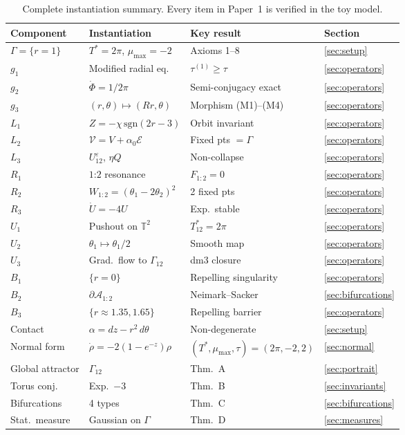 \documentclass[reqno]{amsart}
\numberwithin{equation}{section}
\theoremstyle{plain}
\theoremstyle{definition}
\theoremstyle{remark}
\newcommand{\T}{\mathbb{T}}
\newcommand{\Orb}{\Gamma}
\newcommand{\eps}{\varepsilon}
\begin{document}
\begin{table}[ht]
\centering
\begin{tabular}{@{}llll@{}}
\toprule
Component & Instantiation & Key result & Section\\
\midrule
$\Orb=\{r=1\}$ & $T^*=2\pi$, $\mu_{\max}=-2$ & Axioms 1--8 & \ref{sec:setup}\\
$g_1$ & Modified radial eq. & $\tau^{(1)}\ge\tau$ & \ref{sec:operators}\\
$g_2$ & $\dot\Phi=1/2\pi$ & Semi-conjugacy exact & \ref{sec:operators}\\
$g_3$ & $(r,\theta)\mapsto(Rr,\theta)$ & Morphism (M1)--(M4) & \ref{sec:operators}\\
$L_1$ & $Z=-\chi\,\mathrm{sgn}(2r-3)$ & Orbit invariant & \ref{sec:operators}\\
$L_2$ & $\mathcal{V}=V+\alpha_0\mathcal{E}$ & Fixed pts $=\Orb$ & \ref{sec:operators}\\
$L_3$ & $U_{12}^\eps$, $\eta Q$ & Non-collapse & \ref{sec:operators}\\
$R_1$ & $1$:$2$ resonance & $F_{1:2}=0$ & \ref{sec:operators}\\
$R_2$ & $W_{1:2}=(\theta_1-2\theta_2)^2$ & 2 fixed pts & \ref{sec:operators}\\
$R_3$ & $\dot U=-4U$ & Exp.\ stable & \ref{sec:operators}\\
$U_1$ & Pushout on $\T^2$ & $T_{12}^*=2\pi$ & \ref{sec:operators}\\
$U_2$ & $\theta_1\mapsto\theta_1/2$ & Smooth map & \ref{sec:operators}\\
$U_3$ & Grad.\ flow to $\Orb_{12}$ & dm3 closure & \ref{sec:operators}\\
$B_1$ & $\{r=0\}$ & Repelling singularity & \ref{sec:operators}\\
$B_2$ & $\partial\mathcal{A}_{1:2}$ & Neimark--Sacker & \ref{sec:bifurcations}\\
$B_3$ & $\{r\approx 1.35,1.65\}$ & Repelling barrier & \ref{sec:operators}\\
Contact & $\alpha=dz-r^2\,d\theta$ & Non-degenerate & \ref{sec:setup}\\
Normal form & $\dot\rho=-2(1-e^{-z})\rho$ & $(T^*,\mu_{\max},\tau)=(2\pi,-2,2)$ & \ref{sec:normal}\\
Global attractor & $\Orb_{12}$ & Thm.\ A & \ref{sec:portrait}\\
Torus conj. & Exp.\ $-3$ & Thm.\ B & \ref{sec:invariants}\\
Bifurcations & 4 types & Thm.\ C & \ref{sec:bifurcations}\\
Stat.\ measure & Gaussian on $\Orb$ & Thm.\ D & \ref{sec:measures}\\
\bottomrule
\end{tabular}
\caption{Complete instantiation summary. Every item in Paper~1 is
  verified in the toy model.}
\label{tab:summary}
\end{table}
\end{document}
